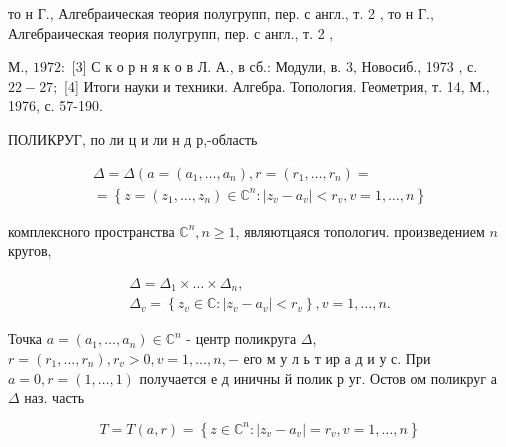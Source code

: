\documentclass[10pt]{article}
\begin{document}
то н Г., Алгебраическая теория полугрупп, пер. с англ., т. 2 , то н Г., Алгебраическая теория полугрупп, пер. с англ., т. 2 ,

М., $1972:$ [3] С к о р н я к о в Л. А., в сб.: Модули, в. 3, Новосиб., 1973 , с. $22-27 ;$ [4] Итоги науки и техники. Алгебра. Топология. Геометрия, т. 14, М., 1976, с. 57-190.



ПОЛИКРУГ, по ли ц и ли н д р,-область



\[

\begin{gathered}

\Delta=\Delta\left(a=\left(a_{1}, \ldots, a_{n}\right), r=\left(r_{1}, \ldots, r_{n}\right)=\right. \\

=\left\{z=\left(z_{1}, \ldots, z_{n}\right) \in \mathbb{C}^{n}:\left|z_{v}-a_{v}\right|<r_{v}, v=1, \ldots, n\right\}

\end{gathered}

\]



комплексного пространства $\mathbb{C}^{n}, n \geqslant 1$, являютцаяся топологич. произведением $n$ кругов,



\[

\begin{gathered}

\Delta=\Delta_{1} \times \ldots \times \Delta_{n}, \\

\Delta_{v}=\left\{z_{v} \in \mathbb{C}:\left|z_{v}-a_{v}\right|<r_{v}\right\}, v=1, \ldots, n .

\end{gathered}

\]



Точка $a=\left(a_{1}, \ldots, a_{n}\right) \in \mathbb{C}^{n}$ - центр поликруга $\Delta$, $r=\left(r_{1}, \ldots, r_{n}\right), r_{v}>0, v=1, \ldots, n,-$ его м у л ь т ир а д и у с. При $a=0, r=(1, \ldots, 1)$ получается е д иничны й полик р уг. Остов ом поликруг а $\Delta$ наз. часть



\[

T=T(a, r)=\left\{z \in \mathbb{C}^{n}:\left|z_{v}-a_{v}\right|=r_{v}, v=1, \ldots, n\right\}

\]
\end{document}
